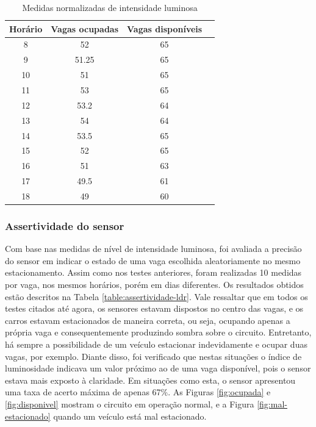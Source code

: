 \documentclass[oneside,openright,12pt]{ufsm_2015} %
\begin{document}
    \begin{table}[ht]
         \centering
         \caption{Medidas normalizadas de intensidade luminosa}
         \begin{tabular}{ c c c c }
             \hline
              Horário & Vagas ocupadas & Vagas disponíveis \\ 
             \hline
             8 & 52 & 65\\
             \hline
             9 & 51.25 & 65\\
             \hline
             10 & 51 & 65\\
             \hline
             11 & 53 & 65\\
             \hline
             12 & 53.2 & 64\\
             \hline
             13 & 54 & 64\\
             \hline
             14 & 53.5 & 65\\
             \hline
             15 & 52 & 65\\
             \hline
             16 & 51 & 63\\
             \hline
             17 & 49.5 & 61\\
             \hline
             18 & 49 & 60\\
             \hline
         \end{tabular}
         \vspace{\baselineskip} %
          \label{table:indices-ldr}
    \end{table}
    
    \subsubsection{Assertividade do sensor}
    Com base nas medidas de nível de intensidade luminosa, foi avaliada a precisão do sensor em indicar o estado de uma vaga escolhida aleatoriamente no mesmo estacionamento. Assim como nos testes anteriores, foram realizadas 10 medidas por vaga, nos mesmos horários, porém em dias diferentes. Os resultados obtidos estão descritos na Tabela \ref{table:assertividade-ldr}. Vale ressaltar que em todos os testes citados até agora, os sensores estavam dispostos no centro das vagas, e os carros estavam estacionados de maneira correta, ou seja, ocupando apenas a própria vaga e consequentemente produzindo sombra sobre o circuito. Entretanto, há sempre a possibilidade de um veículo estacionar indevidamente e ocupar duas vagas, por exemplo. Diante disso, foi verificado que nestas situações o índice de luminosidade indicava um valor próximo ao de uma vaga disponível, pois o sensor estava mais exposto à claridade. Em situações como esta, o sensor apresentou uma taxa de acerto máxima de apenas 67\%. As Figuras \ref{fig:ocupada} e \ref{fig:disponivel} mostram o circuito em operação normal, e a Figura \ref{fig:mal-estacionado} quando um veículo está mal estacionado.
    
\end{document}
